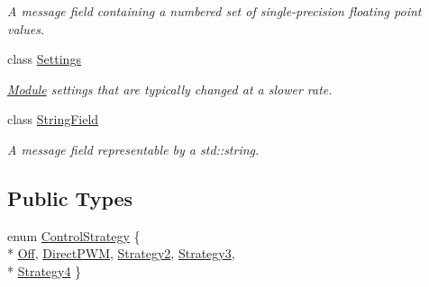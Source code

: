 \begin{DoxyCompactItemize}
\begin{DoxyCompactList}\small\item\em A message field containing a numbered set of single-\/precision floating point values. \end{DoxyCompactList}\item 
class \hyperlink{classhebi_1_1Command_1_1Settings}{Settings}
\begin{DoxyCompactList}\small\item\em \hyperlink{classhebi_1_1Module}{Module} settings that are typically changed at a slower rate. \end{DoxyCompactList}\item 
class \hyperlink{classhebi_1_1Command_1_1StringField}{String\+Field}
\begin{DoxyCompactList}\small\item\em A message field representable by a std\+::string. \end{DoxyCompactList}\end{DoxyCompactItemize}
\subsection*{Public Types}
\begin{DoxyCompactItemize}
\item 
enum \hyperlink{classhebi_1_1Command_a0f4b41003c36dee21578caddb605c64a}{Control\+Strategy} \{ \\*
\hyperlink{classhebi_1_1Command_a0f4b41003c36dee21578caddb605c64aafe98afde491faf74d257f008c2f68ee9}{Off}, 
\hyperlink{classhebi_1_1Command_a0f4b41003c36dee21578caddb605c64aa4caa7bdaeb957f4d606344937eca082f}{Direct\+P\+WM}, 
\hyperlink{classhebi_1_1Command_a0f4b41003c36dee21578caddb605c64aa46262e3b8b0440dcad719de382c8adda}{Strategy2}, 
\hyperlink{classhebi_1_1Command_a0f4b41003c36dee21578caddb605c64aab04b6dd90ed193382865ff31530508dd}{Strategy3}, 
\\*
\hyperlink{classhebi_1_1Command_a0f4b41003c36dee21578caddb605c64aab95ab30225f22ad6da4d52868a85d8c1}{Strategy4}
 \}
\end{DoxyCompactItemize}
